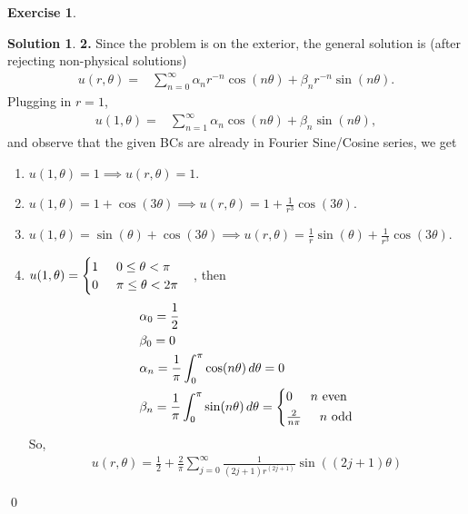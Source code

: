 \documentclass{book}
\theoremstyle{definition}
\newtheorem*{exer*}{Exercise}
\newtheorem*{sln*}{Solution}
\newcommand{\f}[2]{\frac{#1}{#2}}
\begin{document}
\begin{exer*}
	\begin{sln*}\textbf{2. }
		Since the problem is on the exterior, the general solution is (after rejecting non-physical solutions)
		\begin{align*}
		u(r,\theta) =& \sum^\infty_{n=0}\alpha_n r^{-n}\cos(n\theta) + \beta_n r^{-n}\sin(n\theta). 
		\end{align*}
		Plugging in $r=1$,
		\begin{align*}
		u(1,\theta) =& \sum^\infty_{n=1}\alpha_n \cos(n\theta) + \beta_n \sin(n\theta),
		\end{align*}
		and observe that the given BCs are already in Fourier Sine/Cosine series, we get
\begin{enumerate}
	\item $u(1,\theta) = 1 \implies u(r,\theta) = \boxed{1}$.
	\item $u(1,\theta) = 1 + \cos(3\theta) \implies u(r,\theta) = \boxed{1 + \f{1}{r^3}\cos(3\theta)}
	$.
	\item $u(1,\theta) = \sin(\theta) + \cos(3\theta) \implies u(r,\theta) = \boxed{\f{1}{r}\sin(\theta) + \f{1}{r^3}\cos(3\theta)}$.
	\item $u(1,\theta) = \begin{cases}
	1 \hspace{0.5cm} 0 \leq \theta < \pi\\
	0 \hspace{0.5cm} \pi \leq \theta < 2\pi
	\end{cases}$, then
	\begin{align*}
	&\alpha_0 = \f{1}{2}\\
	&\beta_0 = 0\\
	&\alpha_n = \f{1}{\pi}\int_0^{\pi}\cos(n\theta)\,d\theta = 0\\
	&\beta_n = \f{1}{\pi}\int^{\pi}_0 \sin(n\theta)\,d\theta = \begin{cases*}
	0 \hspace{0.5cm} n \text{ even}\\
	\f{2}{n\pi} \hspace{0.5cm} n \text{ odd}
	\end{cases*}
	\end{align*}
	So,
	\begin{align*}
	\boxed{u(r,\theta) = \f{1}{2} + \f{2}{\pi}
		\sum^\infty_{j=0} \f{1}{(2j+1)r^{(2j+1)}}\sin((2j+1)\theta)}
	\end{align*} 
\end{enumerate}\qed
	\end{sln*}
\end{exer*}
\newpage
\end{document}
